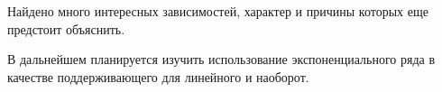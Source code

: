 \documentclass[specialist, substylefile = spbureport.rtx,
    subf,href,colorlinks=true, 12pt]{disser}
\begin{document}
    \conclusion
        Найдено много интересных зависимостей, характер и причины которых еще предстоит объяснить.

        В дальнейшем планируется изучить использование экспоненциального ряда в качестве поддерживающего для линейного и наоборот.
 

        

    

	\renewcommand{\refname}{}
	\vspace{-25pt}
	
	
\end{document}

